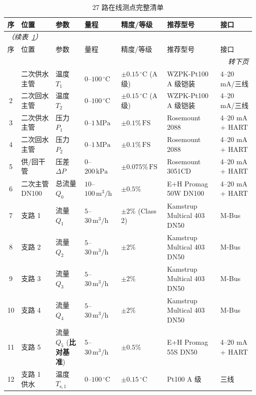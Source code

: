\documentclass[11pt,a4paper]{ctexart}
\begin{document}
\begin{longtable}{clp{2.6cm}p{1.8cm}p{2.0cm}p{3.0cm}p{2.2cm}}
\caption{27 路在线测点完整清单}\label{tab:app_sensors} \\
\toprule
序 & 位置 & 参数 & 量程 & 精度/等级 & 推荐型号 & 接口 \\
\midrule
\endfirsthead
\multicolumn{7}{l}{\textit{（续表~\ref{tab:app_sensors}）}} \\
\toprule
序 & 位置 & 参数 & 量程 & 精度/等级 & 推荐型号 & 接口 \\
\midrule
\endhead
\midrule
\multicolumn{7}{r}{\textit{转下页}} \\
\endfoot
\bottomrule
\endlastfoot
1 & 二次供水主管 & 温度 $T_1$ & $0$--$100\,\mathrm{^\circ C}$ & $\pm 0.15\,\mathrm{^\circ C}$ (A 级) & WZPK-Pt100 A 级铠装 & 4--20 mA/三线 \\
2 & 二次回水主管 & 温度 $T_2$ & $0$--$100\,\mathrm{^\circ C}$ & $\pm 0.15\,\mathrm{^\circ C}$ (A 级) & WZPK-Pt100 A 级铠装 & 4--20 mA/三线 \\
3 & 二次供水主管 & 压力 $P_1$ & $0$--$1\,\mathrm{MPa}$ & $\pm 0.1\%\,\mathrm{FS}$ & Rosemount 2088 & 4--20 mA + HART \\
4 & 二次回水主管 & 压力 $P_2$ & $0$--$1\,\mathrm{MPa}$ & $\pm 0.1\%\,\mathrm{FS}$ & Rosemount 2088 & 4--20 mA + HART \\
5 & 供/回干管 & 压差 $\Delta P$ & $0$--$200\,\mathrm{kPa}$ & $\pm 0.075\%\,\mathrm{FS}$ & Rosemount 3051CD & 4--20 mA + HART \\
6 & 二次主管 DN100 & 总流量 $Q_0$ & $10$--$100\,\mathrm{m^3/h}$ & $\pm 0.5\%$ & E+H Promag 50W DN100 & 4--20 mA + HART \\
7 & 支路 1 & 流量 $Q_1$ & $5$--$30\,\mathrm{m^3/h}$ & $\pm 2\%$ (Class 2) & Kamstrup Multical 403 DN50 & M-Bus \\
8 & 支路 2 & 流量 $Q_2$ & $5$--$30\,\mathrm{m^3/h}$ & $\pm 2\%$ & Kamstrup Multical 403 DN50 & M-Bus \\
9 & 支路 3 & 流量 $Q_3$ & $5$--$30\,\mathrm{m^3/h}$ & $\pm 2\%$ & Kamstrup Multical 403 DN50 & M-Bus \\
10 & 支路 4 & 流量 $Q_4$ & $5$--$30\,\mathrm{m^3/h}$ & $\pm 2\%$ & Kamstrup Multical 403 DN50 & M-Bus \\
11 & 支路 5 & 流量 $Q_5$ (\textbf{比对基准}) & $5$--$30\,\mathrm{m^3/h}$ & $\pm 0.5\%$ & E+H Promag 55S DN50 & 4--20 mA + HART \\
12 & 支路 1 供水 & 温度 $T_{\mathrm{s},1}$ & $0$--$100\,\mathrm{^\circ C}$ & $\pm 0.15\,\mathrm{^\circ C}$ & Pt100 A 级 & 三线 \\

\end{longtable}
\end{document}

